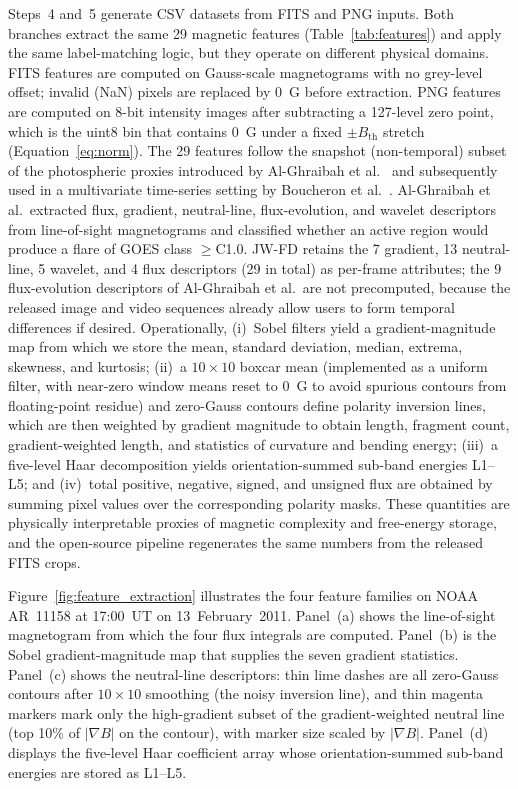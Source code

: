 \documentclass[universe,article,submit,moreauthors]{Definitions/mdpi}
\begin{document}
Steps~4 and~5 generate CSV datasets from FITS and PNG inputs. Both branches extract the same 29 magnetic features (Table~\ref{tab:features}) and apply the same label-matching logic, but they operate on different physical domains. FITS features are computed on Gauss-scale magnetograms with no grey-level offset; invalid (NaN) pixels are replaced by $0$~G before extraction. PNG features are computed on 8-bit intensity images after subtracting a 127-level zero point, which is the uint8 bin that contains $0$~G under a fixed $\pm B_{\mathrm{th}}$ stretch (Equation~\ref{eq:norm}). The 29 features follow the snapshot (non-temporal) subset of the photospheric proxies introduced by Al-Ghraibah et al.~\cite{AlGhraibah2015} and subsequently used in a multivariate time-series setting by Boucheron et al.~\cite{Boucheron2015}. Al-Ghraibah et al.\ extracted flux, gradient, neutral-line, flux-evolution, and wavelet descriptors from line-of-sight magnetograms and classified whether an active region would produce a flare of GOES class $\geq$C1.0. JW-FD retains the 7 gradient, 13 neutral-line, 5 wavelet, and 4 flux descriptors (29 in total) as per-frame attributes; the 9 flux-evolution descriptors of Al-Ghraibah et al.\ are not precomputed, because the released image and video sequences already allow users to form temporal differences if desired. Operationally, (i)~Sobel filters yield a gradient-magnitude map from which we store the mean, standard deviation, median, extrema, skewness, and kurtosis; (ii)~a $10\times10$ boxcar mean (implemented as a uniform filter, with near-zero window means reset to $0$~G to avoid spurious contours from floating-point residue) and zero-Gauss contours define polarity inversion lines, which are then weighted by gradient magnitude to obtain length, fragment count, gradient-weighted length, and statistics of curvature and bending energy; (iii)~a five-level Haar decomposition yields orientation-summed sub-band energies L1--L5; and (iv)~total positive, negative, signed, and unsigned flux are obtained by summing pixel values over the corresponding polarity masks. These quantities are physically interpretable proxies of magnetic complexity and free-energy storage, and the open-source pipeline regenerates the same numbers from the released FITS crops.

Figure~\ref{fig:feature_extraction} illustrates the four feature families on NOAA AR~11158 at 17:00~UT on 13~February~2011. Panel~(a) shows the line-of-sight magnetogram from which the four flux integrals are computed. Panel~(b) is the Sobel gradient-magnitude map that supplies the seven gradient statistics. Panel~(c) shows the neutral-line descriptors: thin lime dashes are all zero-Gauss contours after $10\times10$ smoothing (the noisy inversion line), and thin magenta markers mark only the high-gradient subset of the gradient-weighted neutral line (top 10\% of $|\nabla B|$ on the contour), with marker size scaled by $|\nabla B|$. Panel~(d) displays the five-level Haar coefficient array whose orientation-summed sub-band energies are stored as L1--L5.
\end{document}
